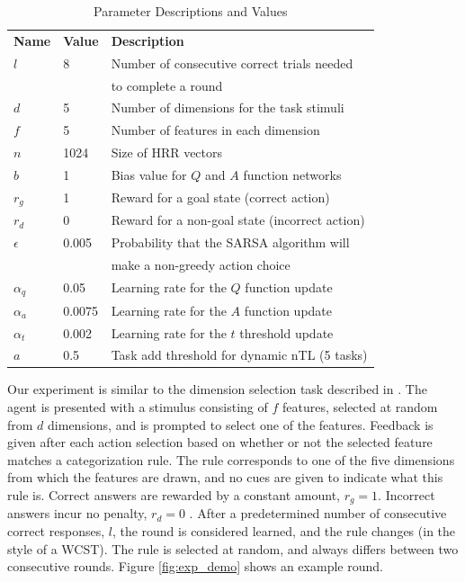 \documentclass[10pt,letterpaper]{article}
\begin{document}
\begin{table}[!b]
{\small
  \caption{Parameter Descriptions and Values }
  \label{tab:parameters}
  \centering
  \begin{tabular}{lll}
    \toprule
    \midrule
    \textbf{Name}     & \textbf{Value}    & \textbf{Description}   \\
    $ l $   & 8         & Number of consecutive correct trials needed \\
    $  $   &            & to complete a round \\
    $ d $   & 5         & Number of dimensions for the task stimuli \\
    $ f $   & 5         & Number of features in each dimension \\
    $ n $   & 1024      & Size of HRR vectors \\
    $ b $   & 1         & Bias value for $ Q $ and $ A $ function networks \\
    $ r_g $ & 1         & Reward for a goal state (correct action) \\
    $ r_d $ & 0         & Reward for a non-goal state (incorrect action) \\
    $ \epsilon $ & 0.005 & Probability that the SARSA algorithm will \\
    $ $ &               & make a non-greedy action choice \\
    $ \alpha_q $ & 0.05  & Learning rate for the $ Q $ function update \\
    $ \alpha_a $ & 0.0075 & Learning rate for the $ A $ function update \\
    $ \alpha_t $ & 0.002 & Learning rate for the $ t $ threshold update \\
    $ a $ & 0.5        & Task add threshold for dynamic nTL (5 tasks) \\
    \bottomrule
  \end{tabular}
}
\end{table}

Our experiment is similar to the dimension selection task described in \cite{rougier_prefrontal_2005}. The agent is presented with a stimulus consisting of $f$ features, selected at random from $d$ dimensions, and is prompted to select one of the features. Feedback is given after each action selection based on whether or not the selected feature matches a categorization rule. The rule corresponds to one of the five dimensions from which the features are drawn, and no cues are given to indicate what this rule is. Correct answers are rewarded by a constant amount, $r_g = 1$. Incorrect answers incur no penalty, $r_d = 0$ . After a predetermined number of consecutive correct responses, $l$, the round is considered learned, and the rule changes (in the style of a WCST). The rule is selected at random, and always differs between two consecutive rounds. Figure \ref{fig:exp_demo} shows an example round.
\end{document}
